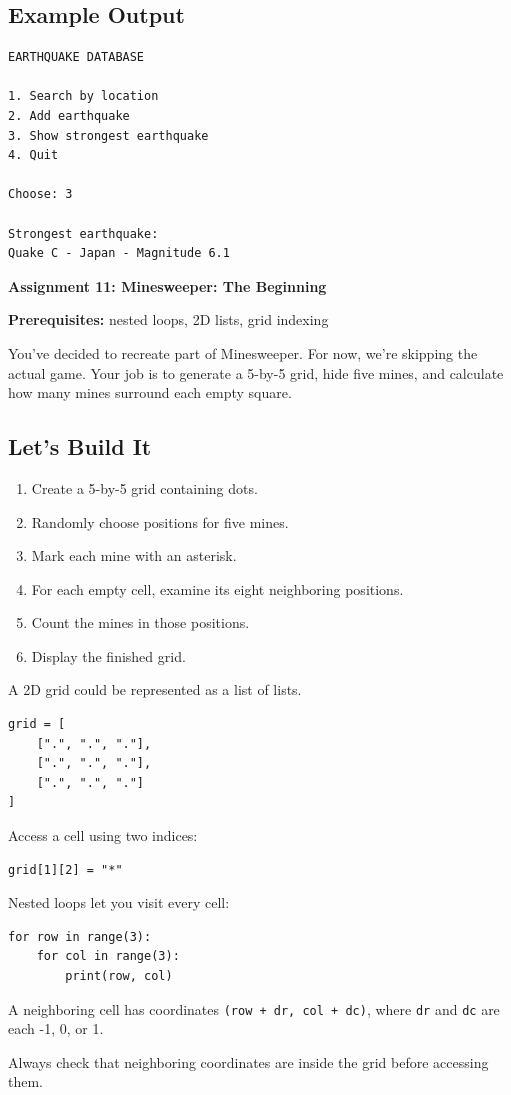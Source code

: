 \documentclass[11pt,letterpaper]{article}
\newcommand{\assignment}[3]{
    \clearpage
    {\Large\bfseries\color{navy} Assignment #1: #2}

    \vspace{2mm}
    {\small\color{darkgray}\textbf{Prerequisites:} #3}

    \vspace{3mm}
}
\newcommand{\steps}{\subsection*{Let's Build It}}
\newcommand{\exampleoutput}{\subsection*{Example Output}}
\begin{document}
\exampleoutput

\begin{lstlisting}[style=outputstyle]
EARTHQUAKE DATABASE

1. Search by location
2. Add earthquake
3. Show strongest earthquake
4. Quit

Choose: 3

Strongest earthquake:
Quake C - Japan - Magnitude 6.1
\end{lstlisting}

\assignment{11}{Minesweeper: The Beginning}
{nested loops, 2D lists, grid indexing}

\begin{missionbox}
You've decided to recreate part of Minesweeper. For now, we're skipping the actual game. Your job is to generate a 5-by-5 grid, hide five mines, and calculate how many mines surround each empty square.
\end{missionbox}

\steps

\begin{enumerate}
    \item Create a 5-by-5 grid containing dots.
    \item Randomly choose positions for five mines.
    \item Mark each mine with an asterisk.
    \item For each empty cell, examine its
    eight neighboring positions.
    \item Count the mines in those positions.
    \item Display the finished grid.
\end{enumerate}

\begin{hintbox}
A 2D grid could be represented as a list of lists.

\begin{lstlisting}
grid = [
    [".", ".", "."],
    [".", ".", "."],
    [".", ".", "."]
]
\end{lstlisting}

Access a cell using two indices:

\begin{lstlisting}
grid[1][2] = "*"
\end{lstlisting}

Nested loops let you visit every cell:

\begin{lstlisting}
for row in range(3):
    for col in range(3):
        print(row, col)
\end{lstlisting}

A neighboring cell has coordinates
\texttt{(row + dr, col + dc)}, where
\texttt{dr} and \texttt{dc} are each
-1, 0, or 1.

Always check that neighboring coordinates
are inside the grid before accessing them.
\end{hintbox}
\end{document}
